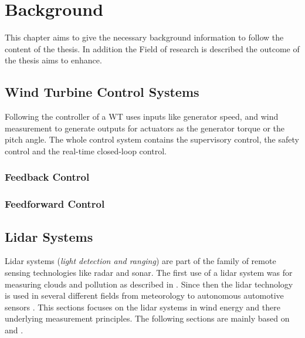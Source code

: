 \chapter{Background} \label{cha:Back}
This chapter aims to give the necessary background information to follow the content of the thesis. In addition the Field of research is described the outcome of the thesis aims to enhance.
\section{Wind Turbine Control Systems}\label{sec:ControlSys}
Following \cite{Burton2011} the controller of a \gls{WT} uses inputs like generator speed, and wind measurement to generate outputs for actuators as the generator torque or the pitch angle. The whole control system contains the supervisory control, the safety control and the real-time closed-loop control.



\subsection{Feedback Control}\label{subsec:FB-Contr}









\subsection{Feedforward Control}\label{subsec:FF-Contr}





\section{Lidar Systems}\label{sec:LidarSys}
Lidar systems (\textit{light detection and ranging}) are part of the family of remote sensing technologies like radar and sonar. The first use of a lidar system was for measuring clouds and pollution as described in \cite{Goyer1963}. Since then the \gls{lidar} technology is used in several different fields from meteorology \cite{Goyer1963} to autonomous automotive sensors \cite{EDN2016}. This sections focuses on the \gls{lidar} systems in wind energy and there underlying measurement principles. The following sections are mainly based on \cite{DTUlidar2013} and \cite{Schlipf2015}.


